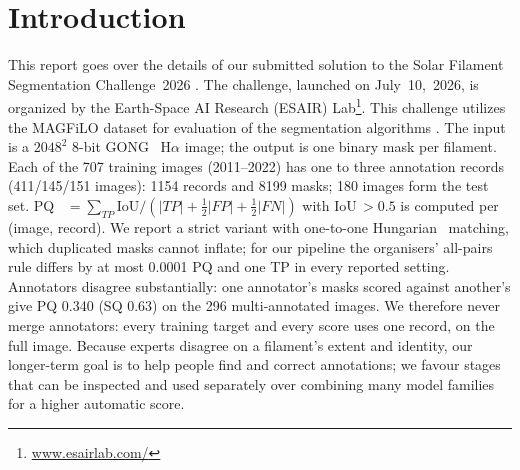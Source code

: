 \documentclass[sigconf]{acmart}
\begin{document}


\section{Introduction}
    This report goes over the details of our submitted solution to the Solar Filament Segmentation Challenge~2026 \cite{filament-segmentation-2026}. The challenge, launched on July~10,~2026, is organized by the Earth-Space AI Research (ESAIR) Lab\footnote{\href{https://www.esairlab.com/home}{www.esairlab.com/}}. This challenge utilizes the MAGFiLO dataset for evaluation of the segmentation algorithms \cite{ahmadzadeh2024dataset}. The input is a $2048^2$ 8-bit GONG~\cite{gong}
    H$\alpha$ image; the output is one binary mask per filament. Each of the 707 training images (2011--2022) has one to
    three annotation records (411/145/151 images): 1154 records and 8199 masks; 180 images form the test set.
    PQ~\cite{pq} $=\sum_{TP}\mathrm{IoU}/(|TP|+\frac12|FP|+\frac12|FN|)$ with IoU\,$>0.5$ is computed per (image,
    record). We report a strict variant with one-to-one Hungarian~\cite{kuhn} matching, which duplicated masks cannot
    inflate; for our pipeline the organisers' all-pairs rule differs by at most 0.0001 PQ and one TP in every reported
    setting. Annotators disagree substantially: one annotator's masks scored against another's give PQ 0.340 (SQ 0.63)
    on the 296 multi-annotated images. We therefore never merge annotators: every training target and every score uses
    one record, on the full image. Because experts disagree on a filament's extent and identity, our longer-term goal is
    to help people find and correct annotations; we favour stages that can be inspected and used separately over
    combining many model families for a higher automatic score.
\end{document}
